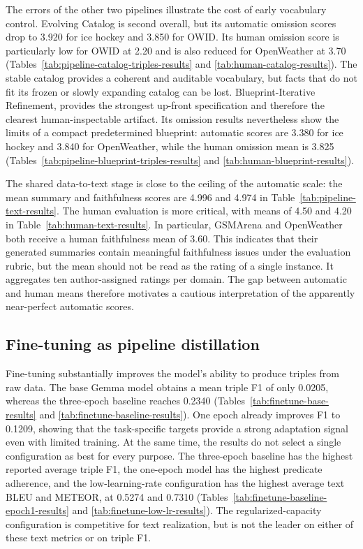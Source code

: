 The errors of the other two pipelines illustrate the cost of early vocabulary
control. Evolving Catalog is second overall, but its automatic omission scores
drop to 3.920 for ice hockey and 3.850 for OWID. Its human omission score is
particularly low for OWID at 2.20 and is also reduced for OpenWeather at 3.70
(Tables~\ref{tab:pipeline-catalog-triples-results} and
\ref{tab:human-catalog-results}). The stable catalog provides a coherent and
auditable vocabulary, but facts that do not fit its frozen or slowly expanding
catalog can be lost. Blueprint-Iterative Refinement,
provides the strongest up-front specification and therefore the clearest
human-inspectable artifact. Its omission results nevertheless show the limits
of a compact predetermined blueprint: automatic scores are 3.380 for ice
hockey and 3.840 for OpenWeather, while the human omission mean is 3.825
(Tables~\ref{tab:pipeline-blueprint-triples-results} and
\ref{tab:human-blueprint-results}).

The shared data-to-text stage is close to the ceiling of the automatic scale:
the mean summary and faithfulness scores are 4.996 and 4.974 in
Table~\ref{tab:pipeline-text-results}. The human evaluation is more critical,
with means of 4.50 and 4.20 in Table~\ref{tab:human-text-results}. In
particular, GSMArena and OpenWeather both receive a human faithfulness mean of
3.60. This indicates that their generated summaries contain meaningful
faithfulness issues under the evaluation rubric, but the mean should not be
read as the rating of a single instance. It aggregates ten author-assigned
ratings per domain. The gap between automatic and human means therefore
motivates a cautious interpretation of the apparently near-perfect automatic
scores.

\subsection{Fine-tuning as pipeline distillation}

Fine-tuning substantially improves the model's ability to produce triples from
raw data. The base Gemma model obtains a mean triple F1 of only 0.0205, whereas
the three-epoch baseline reaches 0.2340
(Tables~\ref{tab:finetune-base-results} and
\ref{tab:finetune-baseline-results}). One epoch already improves F1 to 0.1209,
showing that the task-specific targets provide a strong adaptation signal even
with limited training. At the same time, the results do not select a single
configuration as best for every purpose. The three-epoch baseline has the
highest reported average triple F1, the one-epoch model has the highest
predicate adherence, and the low-learning-rate configuration has the highest
average text BLEU and METEOR, at 0.5274 and 0.7310
(Tables~\ref{tab:finetune-baseline-epoch1-results} and
\ref{tab:finetune-low-lr-results}). The regularized-capacity configuration is
competitive for text realization, but is not the leader on either of these text
metrics or on triple F1.

